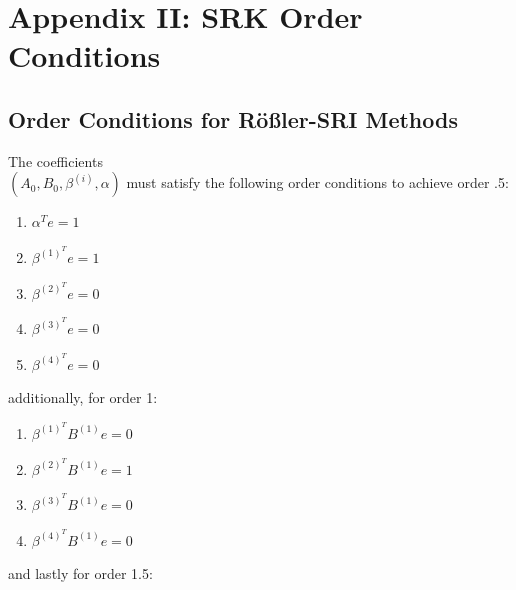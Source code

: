 \documentclass{article}
\begin{document}
\section{Appendix II: SRK Order Conditions }

\subsection{Order Conditions for Rößler-SRI Methods\label{subsec:Order-Conditions-for-SRI}}

The coefficients \\
$\left(A_{0},B_{0},\beta^{(i)},\alpha\right)$ must satisfy the following
order conditions to achieve order .5:

\begin{multicols}{3}
	\begin{enumerate}
		\item $\alpha^{T}e=1$
		\item $\beta^{(1)^{T}}e=1$
		\item $\beta^{(2)^{T}}e=0$
		\item $\beta^{(3)^{T}}e=0$
		\item $\beta^{(4)^{T}}e=0$
	\end{enumerate}
\end{multicols} additionally, for order 1:

\begin{multicols}{2}
	\begin{enumerate}
		\item $\beta^{(1)^{T}}B^{(1)}e=0$
		\item $\beta^{(2)^{T}}B^{(1)}e=1$
		\item $\beta^{(3)^{T}}B^{(1)}e=0$
		\item $\beta^{(4)^{T}}B^{(1)}e=0$
	\end{enumerate}
\end{multicols} and lastly for order 1.5:
\end{document}
